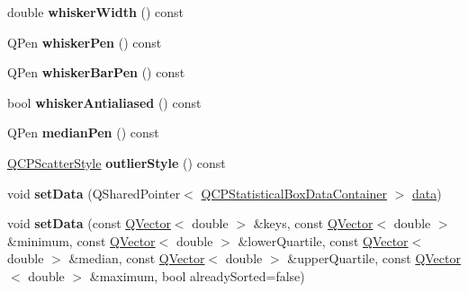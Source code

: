 \begin{DoxyCompactItemize}
\item 
\mbox{\label{class_q_c_p_statistical_box_aacfa6686c7cf4af18794ec02354f4782}} 
double {\bfseries whisker\+Width} () const
\item 
\mbox{\label{class_q_c_p_statistical_box_a67e5144f07645fe25c31001c460817fc}} 
Q\+Pen {\bfseries whisker\+Pen} () const
\item 
\mbox{\label{class_q_c_p_statistical_box_a47ed9ad9d2ca65640319a2f071982ed4}} 
Q\+Pen {\bfseries whisker\+Bar\+Pen} () const
\item 
\mbox{\label{class_q_c_p_statistical_box_a2015a8ea758cf65a41d4a6c52a20696b}} 
bool {\bfseries whisker\+Antialiased} () const
\item 
\mbox{\label{class_q_c_p_statistical_box_af767bc7b6b477d005535314b35aca683}} 
Q\+Pen {\bfseries median\+Pen} () const
\item 
\mbox{\label{class_q_c_p_statistical_box_aef92e38fcb8e5041a44c2e01886e3b66}} 
\hyperlink{class_q_c_p_scatter_style}{Q\+C\+P\+Scatter\+Style} {\bfseries outlier\+Style} () const
\item 
\mbox{\label{class_q_c_p_statistical_box_a08a6da55822bad825ee25a8069b9b52f}} 
void {\bfseries set\+Data} (Q\+Shared\+Pointer$<$ \hyperlink{class_q_c_p_data_container}{Q\+C\+P\+Statistical\+Box\+Data\+Container} $>$ \hyperlink{class_q_c_p_statistical_box_a728e501413eaf191544014173d52dfbc}{data})
\item 
\mbox{\label{class_q_c_p_statistical_box_a4ae198e66243d8cc57ad8893c37bf9d4}} 
void {\bfseries set\+Data} (const \hyperlink{class_q_vector}{Q\+Vector}$<$ double $>$ \&keys, const \hyperlink{class_q_vector}{Q\+Vector}$<$ double $>$ \&minimum, const \hyperlink{class_q_vector}{Q\+Vector}$<$ double $>$ \&lower\+Quartile, const \hyperlink{class_q_vector}{Q\+Vector}$<$ double $>$ \&median, const \hyperlink{class_q_vector}{Q\+Vector}$<$ double $>$ \&upper\+Quartile, const \hyperlink{class_q_vector}{Q\+Vector}$<$ double $>$ \&maximum, bool already\+Sorted=false)

\end{DoxyCompactItemize}

